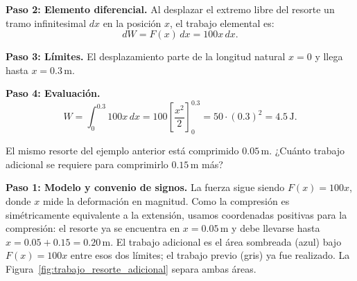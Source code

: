 \begin{example}
\begin{myproof}
\textbf{Paso 2: Elemento diferencial.}
Al desplazar el extremo libre del resorte un tramo infinitesimal $dx$ en
la posición $x$, el trabajo elemental es:
\[
  dW = F(x)\,dx = 100x\,dx.
\]

\textbf{Paso 3: Límites.}
El desplazamiento parte de la longitud natural $x=0$ y llega hasta
$x=0.3\,\text{m}$.

\textbf{Paso 4: Evaluación.}
\[
  W = \int_0^{0.3}100x\,dx
    = 100\left[\frac{x^2}{2}\right]_0^{0.3}
    = 50\cdot(0.3)^2
    = \boxed{4.5\,\text{J}}.
\]
\end{myproof}
\end{example}


\begin{example}
El mismo resorte del ejemplo anterior está comprimido $0.05\,\text{m}$.
¿Cuánto trabajo adicional se requiere para comprimirlo $0.15\,\text{m}$ más?

\begin{myproof}
\textbf{Paso 1: Modelo y convenio de signos.}
La fuerza sigue siendo $F(x)=100x$, donde $x$ mide la deformación en magnitud.
Como la compresión es simétricamente equivalente a la extensión, usamos
coordenadas positivas para la compresión: el resorte ya se encuentra en
$x=0.05\,\text{m}$ y debe llevarse hasta $x=0.05+0.15=0.20\,\text{m}$.
El trabajo adicional es el área sombreada (azul) bajo $F(x)=100x$
entre esos dos límites; el trabajo previo (gris) ya fue realizado.
La Figura~\ref{fig:trabajo_resorte_adicional} separa ambas áreas.


\end{myproof}
\end{example}
